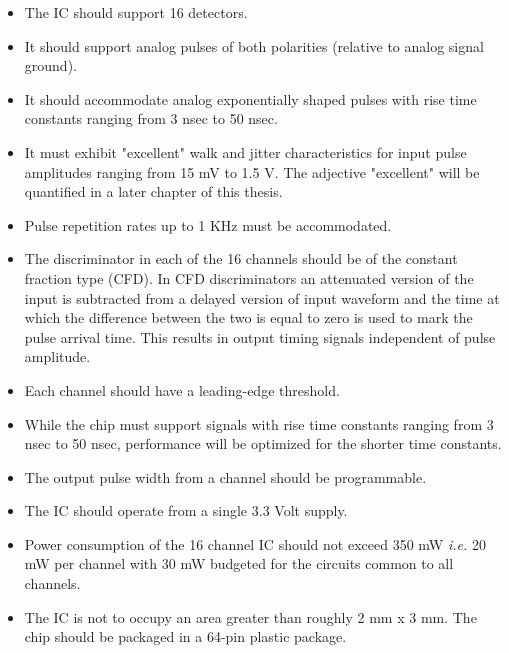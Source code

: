 \documentclass[12pt,oneside,final]{siuethesis}
\theoremstyle{definition}
\begin{document}
\begin{itemize}
\item
The IC should support 16 detectors.
\item
It should support analog pulses of both polarities (relative to analog signal ground).
\item
It should accommodate analog exponentially shaped pulses with rise time constants ranging from 3 nsec to 50 nsec.
\item
It must exhibit "excellent" walk and jitter characteristics for input pulse amplitudes ranging from 15 mV to 1.5 V. The adjective "excellent" will be quantified in a later chapter of this thesis.
\item
Pulse repetition rates up to 1 KHz must be accommodated.
\item
The discriminator in each of the 16 channels should be of the constant fraction type (CFD). In CFD discriminators an attenuated version of the input is subtracted from a delayed version of input waveform and the time at which the difference between the two is equal to zero is used to mark the pulse arrival time. This results in output timing signals independent of pulse amplitude.
\item
Each channel should have a leading-edge threshold.
\item
While the chip must support signals with rise time constants ranging from 3 nsec to 50 nsec, performance will be optimized for the shorter time constants. 
\item
The output pulse width from a channel should be programmable.
\item
The IC should operate from a single 3.3 Volt supply.
\item
Power consumption of the 16 channel IC should not exceed 350 mW \emph{i.e.} 20 mW per channel with 30 mW budgeted for the circuits common to all channels. 
\item
The IC is not to occupy an area greater than roughly 2 mm x 3 mm.  The chip should be packaged in a 64-pin plastic package.  

\end{itemize} 
\end{document}
